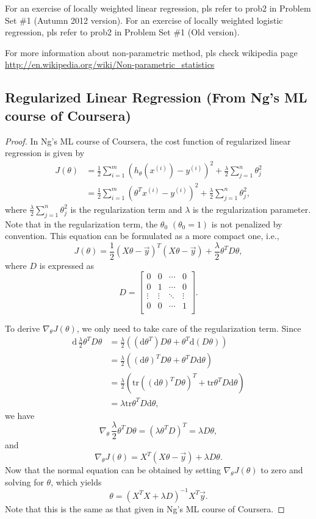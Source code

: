 \documentclass{article}
\begin{document}
For an exercise of locally weighted linear regression, pls refer to prob2 in Problem Set \#1 (Autumn 2012 version). For an exercise of locally weighted logistic regression, pls refer to prob2 in Problem Set \#1 (Old version).

For more information about non-parametric method, pls check wikipedia page
\url{http://en.wikipedia.org/wiki/Non-parametric_statistics}



\subsection{Regularized Linear Regression (From Ng's ML course of Coursera)}
\begin{proof}
In Ng's ML course of Coursera, the cost function of regularized linear regression is given by
\[
\begin{split}
J(\theta)&=\frac{1}{2}\sum_{i=1}^{m} (h_{\theta}(x^{(i)})-y^{(i)})^2 + \frac{\lambda}{2}\sum_{j=1}^{n}\theta_j^2\\
&=\frac{1}{2}\sum_{i=1}^{m} (\theta^T x^{(i)}-y^{(i)})^2 + \frac{\lambda}{2}\sum_{j=1}^{n}\theta_j^2,
\end{split}
\]
where $\frac{\lambda}{2}\sum_{j=1}^{n}\theta_j^2$ is the regularization term and $\lambda$ is the regularization parameter. Note that in the regularization term, the $\theta_0$ $(\theta_0=1)$ is not penalized by convention. This equation can be formulated as a more compact one, i.e.,
\[
J(\theta)=\frac{1}{2}(X\theta-\vec{y})^T(X\theta-\vec{y}) + \frac{\lambda}{2} \theta^T D \theta,
\]
where $D$ is expressed as
\[
D=
\begin{bmatrix}
0 & 0 & \cdots & 0\\
0 & 1 & \cdots & 0 \\
\vdots & \vdots & \ddots & \vdots\\
0 & 0 & \cdots & 1 \\
\end{bmatrix}.
\]

To derive $\nabla_{\theta}J(\theta)$, we only need to take care of the regularization term. Since
\[
\begin{split}
\text{d}\,\frac{\lambda}{2} \theta^T D \theta &=\frac{\lambda}{2}\left((\text{d} \theta^T) D \theta + \theta^T \text{d}( D \theta)\right)\\
&=\frac{\lambda}{2}\left((\text{d} \theta)^T D \theta + \theta^T  D \text{d}\theta\right)\\
&=\frac{\lambda}{2}\left(\text{tr}((\text{d} \theta)^T D \theta)^T + \text{tr}\theta^T  D \text{d}\theta\right)\\
&=\lambda\text{tr}\theta^T  D \text{d}\theta,
\end{split}
\]
we have
\[
\nabla_{\theta}\,\frac{\lambda}{2} \theta^T D \theta = (\lambda\theta^T  D)^T = \lambda  D\theta,
\]
and
\[
\nabla_{\theta}J(\theta)=X^T(X\theta-\vec{y})+\lambda  D\theta.
\]
Now that the normal equation can be obtained by setting $\nabla_{\theta}J(\theta)$ to zero and solving for $\theta$, which yields
\[
\theta= (X^TX+\lambda  D)^{-1}X^T\vec{y}.
\]
Note that this is the same as that given in Ng's ML course of Coursera.
\end{proof}
\end{document}
